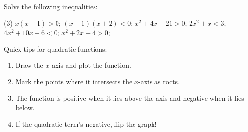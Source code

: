 \begin{questions}
  \item Solve the following inequalities:
  \begin{tasks}(3)
    \task $ x(x - 1) > 0 $;
    \task $ (x - 1)(x + 2) < 0 $;
    \task $ x^2 + 4x - 21 > 0 $;
    \task $ 2x^2 + x < 3 $;
    \task $ 4x^2 + 10x - 6 < 0 $;
    \task $ x^2 + 2x + 4 > 0 $;
  \end{tasks}

  \begin{note}

    \begin{multicols}{2}
      \columnbreak

      Quick tips for quadratic functions:
      \begin{enumerate}
        \item Draw the $x$-axis and plot the function.
        \item Mark the points where it intersects the $x$-axis as roots.
        \item The function is positive when it lies above the axis and negative when it lies below.
        \item If the quadratic term's negative, flip the graph!
      \end{enumerate}
    \end{multicols}
  \end{note}


\end{questions}
